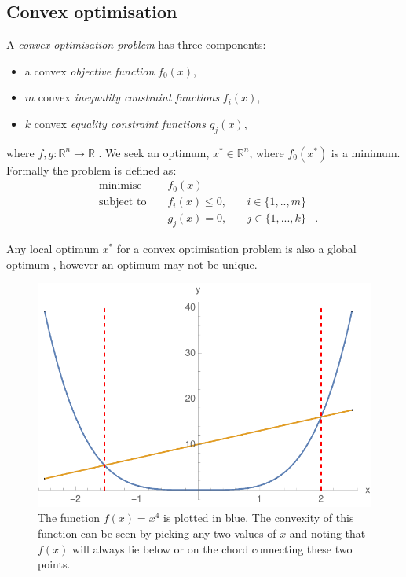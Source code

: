 \documentclass[twocolumn,secnumarabic,amssymb, nobibnotes, aps, prl,superscriptaddress]{revtex4-1}
\begin{document}
\subsection{Convex optimisation}
\noindent A \textit{convex optimisation problem} has three components:
\begin{itemize}
\item a convex \textit{objective function} $f_0(x)$,
\item $m$ convex \textit{inequality constraint functions} $f_i(x)$,
\item $k$ convex \textit{equality constraint functions} $g_j(x)$, 
\end{itemize}
where $f,g: \mathbb{R}^n \rightarrow \mathbb{R}$ \cite[p.141]{cvxpybook}. We seek an optimum, $x^*\in \mathbb{R}^n$, where $f_0(x^*)$ is a minimum. Formally the problem is defined as:
\begin{align} \label{eq:cvxdefn}
&\text{minimise } && f_0(x) & \nonumber &\\
&\text{subject to } && f_i(x) \leq 0,\quad & i\in \{1,..,m\}\nonumber &\\
& && g_{j}(x)=0,\quad & j\in \{1,...,k\} &.
\end{align}

Any local optimum $x^*$ for a convex optimisation problem is also a global optimum \cite[pp.138-139]{cvxpybook}, however an optimum may not be unique.

\begin{figure}[h!]
\includegraphics[width=0.9\linewidth]{convex_function.pdf}
\caption{\label{fig:convex}The function $f(x)=x^4$ is plotted in blue. The convexity of this function can be seen by picking any two values of $x$ and noting that $f(x)$ will always lie below or on the chord connecting these two points.} 
\end{figure}
\end{document}
